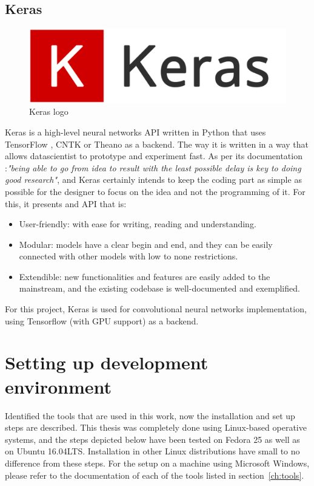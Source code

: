 \subsection{Keras}
\begin{figure}[!ht]
    \centering
    \includegraphics[width=0.5\linewidth]{figures/keras_logo}
    \caption{Keras logo}
    \label{fig:keras_logo}
\end{figure}
Keras is a high-level neural networks API written in Python that uses TensorFlow \cite{TensorFlow}, CNTK \cite{CNTK} or Theano \cite{Theano} as a backend. The way it is written in a way that allows datascientist to prototype and experiment fast. As per its documentation \cite{KERAS}:\emph{"being able to go from idea to result with the least possible delay is key to doing good research"}, and Keras certainly intends to keep the coding part as simple as possible for the designer to focus on the idea and not the programming of it. For this, it presents and API that is:

\begin{itemize}
    \item User-friendly: with ease for writing, reading and understanding.
    \item Modular: models have a clear begin and end, and they can be easily connected with other models with low to none restrictions.
    \item  Extendible: new functionalities and features are easily added to the mainstream, and the existing codebase is well-documented and exemplified.
\end{itemize}

For this project, Keras is used for convolutional neural networks implementation, using Tensorflow (with GPU support) as a backend.

\section{Setting up development environment}
Identified the tools that are used in this work, now the installation and set up steps are described. This thesis was completely done using Linux-based operative systems, and the steps depicted below have been tested on Fedora 25 as well as on Ubuntu 16.04LTS. Installation in other Linux distributions have small to no difference from these steps. For the setup on a machine using Microsoft Windows\texttrademark, please refer to the documentation of each of the tools listed in section~\ref{ch:tools}.\\

